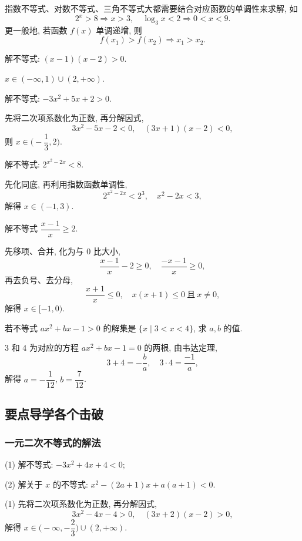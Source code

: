 指数不等式、对数不等式、三角不等式大都需要结合对应函数的单调性来求解, 如
\[2^x>8\Rightarrow x>3,\quad
    \log_3 x<2\Rightarrow 0<x<9.\]
更一般地, 若函数 $f(x)$ 单调递增, 则
\[f(x_1)>f(x_2)\Rightarrow x_1>x_2.\]

\lianxi

\begin{exercise}
    解不等式: $(x-1)(x-2)>0$.
\end{exercise}
\beginsolution
    $x\in(-\infty,1)\cup (2,+\infty)$.
\endsolution

\begin{exercise}
    解不等式: $-3x^2 +5x+2>0$.
\end{exercise}
\beginsolution
    先将二次项系数化为正数, 再分解因式,
    \[3x^2- 5x- 2<0,\quad (3x+1)(x-2)<0,\]
    则 $x\in\biggl(-\dfrac13,2\biggr)$.
\endsolution

\begin{exercise}
    解不等式: $2^{x^2-2x}< 8$.
\end{exercise}
\beginsolution
    先化同底, 再利用指数函数单调性,
    \[2^{x^2-2x}< 2^3,\quad x^2-2x<3,\]
    解得 $x\in (-1,3)$.
\endsolution

\begin{exercise}
    解不等式 $\dfrac{x-1}x\geqslant 2$.
\end{exercise}
\beginsolution
    先移项、合并, 化为与 $0$ 比大小,
    \[\frac{x-1}x- 2\geqslant 0,\quad 
    \frac{-x-1}{x}\geqslant 0,\]
    再去负号、去分母,
    \[\frac{x+1}{x}\leqslant 0,\quad
    x(x+1)\leqslant 0\ \text{且}\ x\neq 0,\]
    解得 $x\in [-1,0)$.
\endsolution

\begin{exercise}
    若不等式 $ax^2 +bx-1>0$ 的解集是 $\{x\mid 3<x<4\}$, 求 $a,b$ 的值.
\end{exercise}
\beginsolution
    $3$ 和 $4$ 为对应的方程 $ax^2 +bx-1= 0$ 的两根, 由韦达定理,
    \[3+4= -\frac{b}{a},\quad 3\cdot 4= \frac{-1}a,\]
    解得 $a= -\dfrac1{12}$, $b=\dfrac{7}{12}$.
\endsolution

\subsection{要点导学\quad 各个击破}
\subsubsection{一元二次不等式的解法}
\begin{example}
    (1) 解不等式: $-3x^2 +4x+4<0$;
    
    (2) 解关于 $x$ 的不等式: $x^2 -(2a+1)x+a(a+1)<0$.
\end{example}
\beginsolution
    (1) 先将二次项系数化为正数, 再分解因式,
    \[3x^2- 4x- 4>0,\quad (3x+2)(x-2)>0,\]
    解得 $x\in\biggl(-\infty,-\dfrac23\biggr)\cup (2,+\infty)$.


